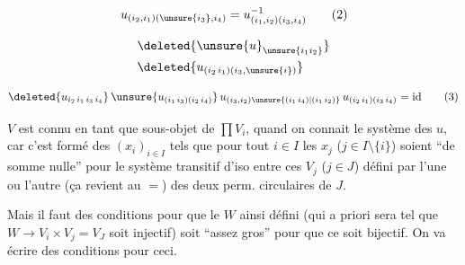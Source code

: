 
\[
u_{(i_2,i_1)(\unsure{i_3},i_4)}
 =u_{(i_1,i_2)(i_3,i_4)}^{-1}\tag*{(2)}
\]


\[
\begin{aligned}
 &\deleted{\unsure{u}_{\unsure{i_1i_2}}}\\
 &\deleted{u_{(i_2\,i_1)(i_3,\unsure{i})}}
\end{aligned}
\]

\[
\deleted{u_{i_2\,i_1\,i_3\,i_4}}\,
\unsure{u_{(i_1\,i_3)(i_2\,i_4)}}\,
u_{(i_3,i_2)\unsure{(i_1\,i_4)|(i_1\,i_2)}}\,u_{(i_2\,i_1)(i_3\,i_4)}=\mathrm{id}\tag*{(3)}
\]

$V$ est connu en tant que sous-objet de $\prod V_i$, quand on connait le système des $u$, car c'est formé des $(x_i)_{i\in I}$ tels que pour tout $i\in I$  les $x_j$ ($j\in I\setminus\{i\}$) soient ``de somme nulle'' pour le système transitif d'iso entre ces $V_j$ ($j\in J$) défini par l'une ou l'autre (ça revient au $=$) des deux perm. circulaires de $J$.

Mais il faut des conditions pour que le $W$ ainsi défini (qui a priori sera tel que $W\longrightarrow V_i\times V_j=V_J$  soit injectif) soit ``assez gros'' pour que ce soit bijectif. On va écrire des conditions pour ceci.

